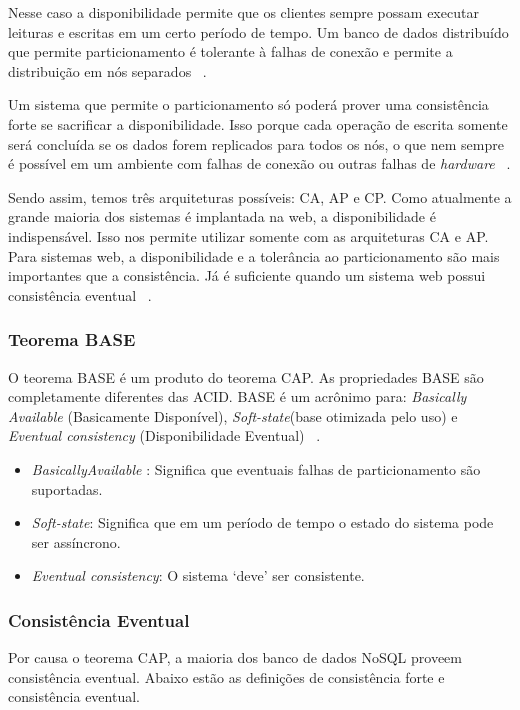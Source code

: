 Nesse caso a disponibilidade permite que os clientes sempre possam executar leituras e escritas em um certo período de tempo. Um banco de dados distribuído que permite particionamento é tolerante à falhas de conexão e permite a distribuição em nós separados ~\cite{Orendanalysisand}.

Um sistema que permite o particionamento só poderá prover uma consistência forte se sacrificar a disponibilidade. Isso porque cada operação de escrita somente será concluída se os dados forem replicados para todos os nós, o que nem sempre é possível em um ambiente com falhas de conexão ou outras falhas de \textit{hardware} ~\cite{Orendanalysisand}.

Sendo assim, temos três arquiteturas possíveis: CA, AP e CP. Como atualmente a grande maioria dos sistemas é implantada na web, a disponibilidade é indispensável. Isso nos permite utilizar somente com as arquiteturas CA e AP. Para sistemas web, a disponibilidade e a tolerância ao particionamento são mais importantes que a consistência. Já é suficiente quando um sistema web possui consistência eventual ~\cite{nosqlaplicassandra}.

\subsubsection{Teorema BASE}

O teorema BASE é um produto do teorema CAP. As propriedades BASE são completamente diferentes das ACID. BASE é um acrônimo para: \textit{Basically Available} (Basicamente Disponível), \textit{Soft-state}(base otimizada pelo uso) e \textit{Eventual consistency} (Disponibilidade Eventual) ~\cite{nosqlaplicassandra}.

\begin{itemize}
\item \textit{BasicallyAvailable} : Significa que eventuais falhas de particionamento são suportadas.
\item \textit{Soft-state}: Significa que em um período de tempo o estado do sistema pode ser assíncrono.
\item \textit{Eventual consistency}: O sistema ‘deve’ ser consistente.
\end{itemize}

\subsubsection{Consistência Eventual}

Por causa o teorema CAP, a maioria dos banco de dados NoSQL proveem consistência eventual. Abaixo estão as definições de consistência forte e consistência eventual.

